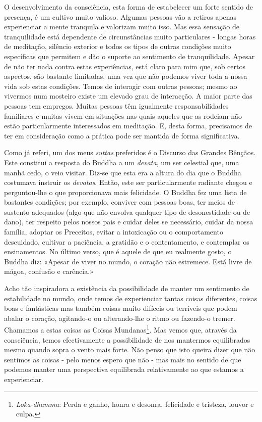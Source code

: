 O desenvolvimento da consciência, esta forma de estabelecer um forte
sentido de presença, é um cultivo muito valioso. Algumas pessoas vão a
retiros apenas experienciar a mente tranquila e valorizam muito isso.
Mas essa sensação de tranquilidade está dependente de circunstâncias
muito particulares - longas horas de meditação, silêncio exterior e
todos os tipos de outras condições muito específicas que permitem e dão
o suporte ao sentimento de tranquilidade. Apesar de não ter nada contra
estas experiências, está claro para mim que, sob certos aspectos, são
bastante limitadas, uma vez que não podemos viver toda a nossa vida sob
estas condições. Temos de interagir com outras pessoas; mesmo ao
vivermos num mosteiro existe um elevado grau de interacção. A maior
parte das pessoas tem empregos. Muitas pessoas têm igualmente
responsabilidades familiares e muitas vivem em situações nas quais
aqueles que as rodeiam não estão particularmente interessados em
meditação. E, desta forma, precisamos de ter em consideração como a
prática pode ser mantida de forma significativa.

Como já referi, um dos meus \emph{suttas} preferidos é o Discurso das
Grandes Bênçãos. Este constitui a resposta do Buddha a um \emph{devata},
um ser celestial que, uma manhã cedo, o veio visitar. \mbox{Diz-se} que esta
era a altura do dia que o Buddha costumava instruir os \emph{devatas}.
Então, este ser particularmente radiante chegou e perguntou-lhe o que
proporcionava mais felicidade. O Buddha fez uma lista de bastantes
condições; por exemplo, conviver com pessoas boas, ter meios de sustento
adequados (algo que não envolva qualquer tipo de desonestidade ou de
dano), ter respeito pelos nossos pais e cuidar deles se necessário,
cuidar da nossa família, adoptar os Preceitos, evitar a intoxicação ou o
comportamento descuidado, cultivar a paciência, a gratidão e o
contentamento, e contemplar os ensinamentos. No último verso, que é
aquele de que eu realmente gosto, o Buddha diz: «Apesar de viver no
mundo, o coração não estremece. Está livre de mágoa, confusão e
carência.»

Acho tão inspiradora a existência da possibilidade de manter um
sentimento de estabilidade no mundo, onde temos de experienciar tantas
coisas diferentes, coisas boas e fantásticas mas também coisas muito
difíceis ou terríveis que podem abalar o coração, agitando-o ou
alterando-lhe o ritmo ou fazendo-o tremer. Chamamos a estas coisas as
Coisas Mundanas\footnote{\emph{Loka-dhamma}: Perda e ganho, honra e
  desonra, felicidade e tristeza, louvor e culpa.}. Mas vemos que,
através da consciência, temos efectivamente a possibilidade de nos
mantermos equilibrados mesmo quando sopra o vento mais forte. Não penso
que isto queira dizer que não sentimos as coisas - pelo menos espero que
não - mas mais no sentido de que podemos manter uma perspectiva
equilibrada relativamente ao que estamos a experienciar.

